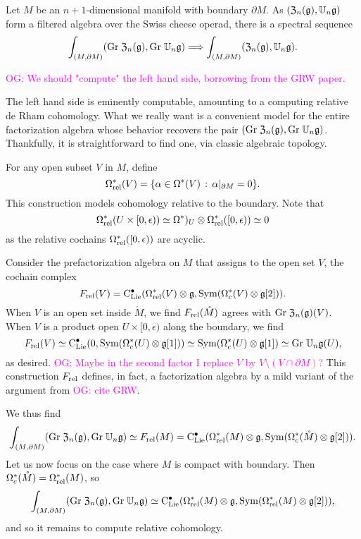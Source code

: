 \documentclass[11pt]{amsart}
\numberwithin{equation}{section}
\def\owen{\textcolor{magenta}{OG: }\textcolor{magenta}}
\begin{document}
\begin{prp}
Let $M$ be an $n+1$-dimensional manifold with boundary $\partial M$. 
As $(\frak{Z}_n(\mathfrak g), \mathbb U_n \mathfrak g)$ form a filtered algebra over the Swiss cheese operad, 
there is a spectral sequence
\[
\int_{(M,\partial M)} ({\rm Gr}\; \frak{Z}_n(\mathfrak g), {\rm Gr}\; \mathbb U_n \mathfrak g) \Longrightarrow \int_{(M,\partial M)} (\frak{Z}_n(\mathfrak g), \mathbb U_n \mathfrak g).
\]
\end{prp}

\owen{We should "compute" the left hand side, borrowing from the GRW paper.}

The left hand side is eminently computable, 
amounting to a computing relative de Rham cohomology.
What we really want is a convenient model for the entire factorization algebra whose behavior recovers the pair $({\rm Gr}\; \frak{Z}_n(\mathfrak g), {\rm Gr}\; \mathbb U_n \mathfrak g)$.
Thankfully, it is straightforward to find one, via classic algebraic topology.

For any open subset $V$ in $M$, define
\[
\Omega^*_{{\rm rel }}(V) = \{ \alpha \in \Omega^*(V) \, : \, \alpha|_{\partial M} = 0\}.
\]
This construction models cohomology relative to the boundary.
Note that
\[
\Omega^*_{{\rm rel }}(U \times [0,\epsilon)) \simeq \Omega^*)_U \otimes \Omega^*_{{\rm rel }}([0,\epsilon)) \simeq 0
\]
as the relative cochains $\Omega^*_{{\rm rel }}([0,\epsilon))$ are acyclic.

Consider the prefactorization algebra on $M$ that assigns to the open set $V$, 
the cochain complex
\[
F_{{\rm rel}}(V) ={\rm C}_{\rm Lie}^\bullet(\Omega^*_{{\rm rel }}(V) \otimes \mathfrak g, {\rm Sym}(\Omega^*_c(V) \otimes \mathfrak g[2])).
\]
When $V$ is an open set inside $\mathring{M}$, we find $F_{{\rm rel}}(\mathring{M})$ agrees with  ${\rm Gr}\; \frak{Z}_n(\mathfrak g)(V)$.
When $V$ is a product open $U \times [0,\epsilon)$ along the boundary, we find 
\[
F_{{\rm rel}}(V) \simeq {\rm C}_{\rm Lie}^\bullet(0, {\rm Sym}(\Omega^*_c(U) \otimes \mathfrak g[1])) \simeq {\rm Sym}(\Omega^*_c(U) \otimes \mathfrak g[1]) \simeq {\rm Gr}\; \mathbb U_n \mathfrak g(U),
\]
as desired.
\owen{Maybe in the second factor I replace $V$ by $V \setminus (V \cap \partial M)$?}
This construction $F_{{\rm rel}}$ defines, in fact, a factorization algebra by a mild variant of the argument from \owen{cite GRW}.

We thus find
\[
\int_{(M,\partial M)} ({\rm Gr}\; \frak{Z}_n(\mathfrak g), {\rm Gr}\; \mathbb U_n \mathfrak g) \simeq F_{{\rm rel}}(M) ={\rm C}_{\rm Lie}^\bullet(\Omega^*_{{\rm rel }}(M) \otimes \mathfrak g, {\rm Sym}(\Omega^*_c(\mathring{M}) \otimes \mathfrak g[2])).
\]
Let us now focus on the case where $M$ is compact with boundary.
Then $\Omega^*_c(\mathring{M}) = \Omega^*_{{\rm rel}}(M)$, so
\[
\int_{(M,\partial M)} ({\rm Gr}\; \frak{Z}_n(\mathfrak g), {\rm Gr}\; \mathbb U_n \mathfrak g) 
\simeq {\rm C}_{\rm Lie}^\bullet(\Omega^*_{{\rm rel }}(M) \otimes \mathfrak g, {\rm Sym}(\Omega^*_{{\rm rel}}(M) \otimes \mathfrak g[2])),
\]
and so it remains to compute relative cohomology.
\end{document}
